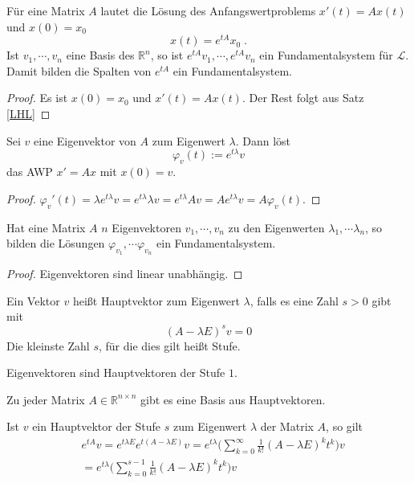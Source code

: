\begin{Satz}
Für eine Matrix $A$ lautet die Lösung des Anfangswertproblems $x'(t) = Ax(t)$ und $x(0) = x_0$
$$ x(t) = e^{tA} x_0 \;.$$ Ist $v_1, \cdots , v_n$ eine Basis des $\mathbb{R}^n$, so ist $e^{tA}v_1, \cdots , e^{tA}v_n$ ein Fundamentalsystem für $\mathcal{L}$. Damit bilden die Spalten von  $e^{tA}$ ein Fundamentalsystem.
\end{Satz}
\begin{proof}
Es ist $x(0) = x_0$ und $x'(t)= A x(t)$. Der Rest folgt aus Satz  \ref{LHL}
\end{proof}

\begin{Lemma}
Sei $v$ eine Eigenvektor von $A$ zum Eigenwert $\lambda$. Dann löst 
$$ \varphi_v(t) := e^{t \lambda} v$$ das AWP $x' = Ax$ mit $x(0) = v$.
\end{Lemma}
\begin{proof}
$\varphi_v'(t) =  \lambda  e^{t \lambda}  v =  e^{t\lambda}  \lambda v =  e^{t\lambda}  A v  = A e^{t\lambda}   v  = A  \varphi_v(t)$.
\end{proof}

\begin{Lemma}
Hat eine Matrix $A$ $n$ Eigenvektoren $v_1, \cdots , v_n$ zu den Eigenwerten $\lambda_1, \cdots  \lambda_n$, 
so bilden die Lösungen $ \varphi_{v_1}, \cdots  \varphi_{v_n}$ ein Fundamentalsystem.
\end{Lemma}
\begin{proof}
Eigenvektoren sind linear unabhängig.
\end{proof}


\begin{Definition}
Ein Vektor $v$ heißt Hauptvektor zum Eigenwert $\lambda$, falls es eine Zahl $s>0$ gibt mit 
$$ (A - \lambda E)^s v = 0$$
Die kleinste Zahl $s$, für die dies gilt heißt Stufe.
\end{Definition}

\begin{Bemerkung}
Eigenvektoren sind Hauptvektoren der Stufe $1$.
\end{Bemerkung}


\begin{Satz}
Zu jeder Matrix $A \in \mathbb{R}^{n \times n}$ gibt es eine Basis aus Hauptvektoren. 
\end{Satz}


\begin{Bemerkung}
Ist $v$ ein Hauptvektor der Stufe $s$ zum Eigenwert $\lambda$ der Matrix $A$, so gilt
\begin{align*}
& e^{tA}v = e^{t \lambda E} e^{t(A - \lambda E)} v = e^{t \lambda}  \biggl( \sum_{k=0}^{\infty} \frac{1}{k!} (A - \lambda E)^k t^k \biggr) v \\
& =  e^{t \lambda}  \biggl ( \sum_{k=0}^{s -1} \frac{1}{k!} (A - \lambda E)^k t^k \biggr) v 
\end{align*}
\end{Bemerkung}
